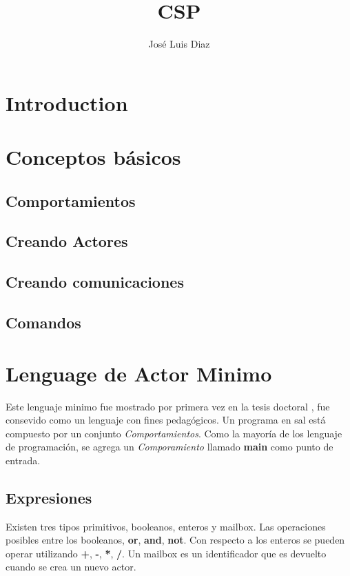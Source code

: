 \documentclass[fleqn]{article}
\title{CSP}
\author{José Luis Diaz}
\date{ }
\begin{document}
 
\maketitle
 
\tableofcontents
 
\section{Introduction}

\section{Conceptos básicos}


\subsection*{Comportamientos}

\subsection*{Creando Actores}

\subsection*{Creando comunicaciones}

\subsection*{Comandos}

\section{Lenguage de Actor Minimo}

Este lenguaje minimo fue mostrado por primera vez en la tesis doctoral
\cite{Agha:1986:AMC:7929}, fue consevido como un lenguaje con fines pedagógicos.
Un programa en sal está compuesto por un conjunto \textit{Comportamientos}.
Como la mayoría de los lenguaje de programación, se agrega un
\textit{Comporamiento} llamado \textbf{main} como punto de entrada.

\subsection{Expresiones}

Existen tres tipos primitivos, booleanos, enteros y mailbox. Las operaciones
posibles entre los booleanos, \textbf{or}, \textbf{and}, \textbf{not}. Con
respecto a los enteros se pueden operar utilizando \textbf{+}, \textbf{-},
\textbf{*}, \textbf{/}. Un mailbox es un identificador que es devuelto cuando se
crea un nuevo actor.
\end{document}
